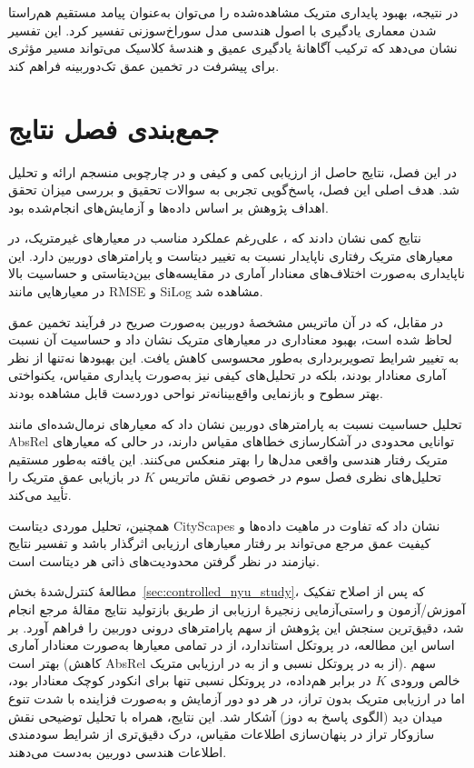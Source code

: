 در نتیجه،
بهبود پایداری متریک مشاهده‌شده
را می‌توان به‌عنوان
پیامد مستقیم هم‌راستا شدن
معماری یادگیری با اصول هندسی
مدل سوراخ‌سوزنی تفسیر کرد.
این تفسیر نشان می‌دهد که
ترکیب آگاهانهٔ یادگیری عمیق
و هندسهٔ کلاسیک
می‌تواند مسیر مؤثری
برای پیشرفت در تخمین عمق تک‌دوربینه فراهم کند.


\section{جمع‌بندی فصل نتایج}
\label{sec:results_summary}

در این فصل، نتایج حاصل از ارزیابی کمی و کیفی
\proposedmodel{} و \basemodel{}
در چارچوبی منسجم ارائه و تحلیل شد.
هدف اصلی این فصل،
پاسخ‌گویی تجربی به سوالات تحقیق
و بررسی میزان تحقق اهداف پژوهش
بر اساس داده‌ها و آزمایش‌های انجام‌شده بود.

نتایج کمی نشان دادند که
\basemodel{}،
علی‌رغم عملکرد مناسب در معیارهای غیرمتریک،
در معیارهای متریک رفتاری ناپایدار
نسبت به تغییر دیتاست و پارامترهای دوربین دارد.
این ناپایداری به‌صورت اختلاف‌های معنادار آماری
در مقایسه‌های بین‌دیتاستی
و حساسیت بالا در معیارهایی مانند RMSE و SiLog
مشاهده شد.

در مقابل،
\proposedmodel{} که در آن
ماتریس مشخصهٔ دوربین به‌صورت صریح
در فرآیند تخمین عمق لحاظ شده است،
بهبود معناداری در معیارهای متریک نشان داد
و حساسیت آن نسبت به تغییر شرایط تصویربرداری
به‌طور محسوسی کاهش یافت.
این بهبودها نه‌تنها از نظر آماری معنادار بودند،
بلکه در تحلیل‌های کیفی نیز
به‌صورت پایداری مقیاس،
یکنواختی بهتر سطوح
و بازنمایی واقع‌بینانه‌تر نواحی دوردست
قابل مشاهده بودند.

تحلیل حساسیت نسبت به پارامترهای دوربین
نشان داد که
معیارهای نرمال‌شده‌ای مانند AbsRel
توانایی محدودی در آشکارسازی خطاهای مقیاس دارند،
در حالی که معیارهای متریک
رفتار هندسی واقعی مدل‌ها را بهتر منعکس می‌کنند.
این یافته به‌طور مستقیم
تحلیل‌های نظری فصل سوم
در خصوص نقش ماتریس $K$
در بازیابی عمق متریک را تأیید می‌کند.

همچنین،
تحلیل موردی دیتاست CityScapes
نشان داد که
تفاوت در ماهیت داده‌ها
و کیفیت عمق مرجع
می‌تواند بر رفتار معیارهای ارزیابی اثرگذار باشد
و تفسیر نتایج نیازمند در نظر گرفتن
محدودیت‌های ذاتی هر دیتاست است.

مطالعهٔ کنترل‌شدهٔ بخش~\ref{sec:controlled_nyu_study}،
که پس از اصلاح تفکیک آموزش/آزمون 
و راستی‌آزمایی زنجیرهٔ ارزیابی از طریق بازتولید نتایج مقالهٔ مرجع انجام شد،
دقیق‌ترین سنجش این پژوهش از سهم پارامترهای درونی دوربین را فراهم آورد.
بر اساس این مطالعه،
\proposedmodel{}  در پروتکل استاندارد،
از \publishedbasemodel{}
در تمامی معیارها به‌صورت معنادار آماری بهتر است
(کاهش AbsRel از  به  در پروتکل نسبی
و از  به  در ارزیابی متریک).
سهم خالص ورودی $K$ در برابر \controlmodel{} هم‌داده،
در پروتکل نسبی تنها برای انکودر کوچک معنادار بود،
اما در ارزیابی متریک بدون تراز،
در هر دو دور آزمایش و به‌صورت فزاینده با شدت تنوع میدان دید
(الگوی پاسخ به دوز) آشکار شد.
این نتایج، همراه با تحلیل توضیحی نقش سازوکار تراز در پنهان‌سازی اطلاعات مقیاس،
درک دقیق‌تری از شرایط سودمندی اطلاعات هندسی دوربین به‌دست می‌دهند.

